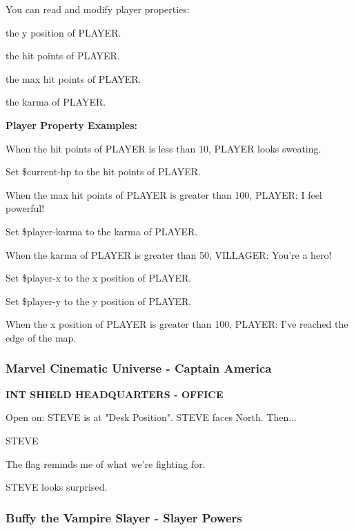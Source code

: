 \documentclass[11pt,letterpaper,oldstylefigures]{memoir}
\newcommand{\slugline}[1]{\nobreak\textbf{\MakeUppercase{#1}}\par\nobreak\vspace{1\baselineskip}}
\newcommand{\speaker}[1]{\nobreak\hspace*{0.333\textwidth}\MakeUppercase{#1}\par\nobreak\vspace{0.5\baselineskip}}
\newcommand{\dialogue}[1]{\nobreak\hspace*{0.25\textwidth}\begin{minipage}{0.5\textwidth}#1\end{minipage}\par\vspace{1\baselineskip}}
\newcommand{\stagedir}[1]{#1\par\vspace{1\baselineskip}}
\newenvironment{FountainExample}
  {\begingroup
  \ttfamily\small
   \setlength{\parindent}{0pt}
  \setlength{\parskip}{0.5em}
  \allowdisplaybreaks
  \setlength{\displaywidowpenalty}{0}
  \setlength{\widowpenalty}{0}
  \setlength{\clubpenalty}{0}
  \setlength{\interlinepenalty}{0}
}
  {\endgroup}
\begin{document}
You can read and modify player properties:
\begin{FountainExample}
\stagedir{the y position of PLAYER.}
\end{FountainExample}
\begin{FountainExample}
\stagedir{the hit points of PLAYER.}
\end{FountainExample}
\begin{FountainExample}
\stagedir{the max hit points of PLAYER.}
\end{FountainExample}
\begin{FountainExample}
\stagedir{the karma of PLAYER.}
\end{FountainExample}

\textbf{Player Property Examples:}
\begin{FountainExample}
\stagedir{When the hit points of PLAYER is less than 10, PLAYER looks sweating.}
\stagedir{Set \$current-hp to the hit points of PLAYER.}
\stagedir{When the max hit points of PLAYER is greater than 100, PLAYER: I feel powerful!}
\stagedir{Set \$player-karma to the karma of PLAYER.}
\stagedir{When the karma of PLAYER is greater than 50, VILLAGER: You're a hero!}
\stagedir{Set \$player-x to the x position of PLAYER.}
\stagedir{Set \$player-y to the y position of PLAYER.}
\stagedir{When the x position of PLAYER is greater than 100, PLAYER: I've reached the edge of the map.}
\end{FountainExample}

\subsubsection*{Marvel Cinematic Universe - Captain America}
\label{ex:marvel-cinematic-universe-captain-america}

\begin{FountainExample}
\slugline{INT SHIELD HEADQUARTERS - OFFICE}

\stagedir{Open on: STEVE is at "Desk Position". STEVE faces North. Then...}

\speaker{STEVE}
\dialogue{The flag reminds me of what we're fighting for.}

\stagedir{STEVE looks surprised.}
\end{FountainExample}

\subsubsection*{Buffy the Vampire Slayer - Slayer Powers}
\label{ex:buffy-the-vampire-slayer-slayer-powers}
\end{document}
